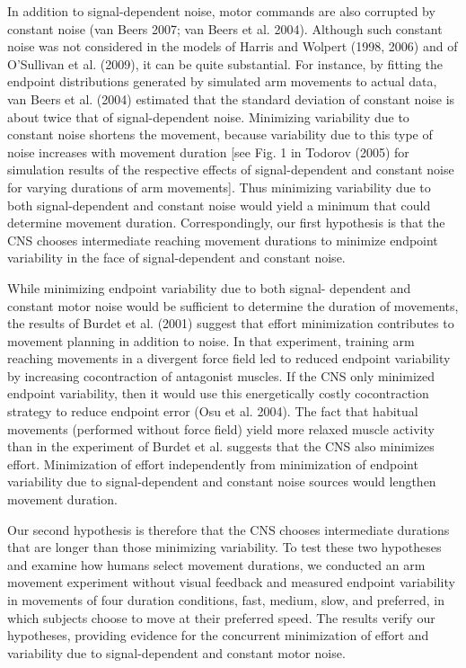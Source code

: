 In addition to signal-dependent noise, motor commands are also corrupted by constant noise (van Beers 2007; van Beers et al. 2004). Although such constant noise was not considered in the models of Harris and Wolpert (1998, 2006) and of O’Sullivan et al. (2009), it can be quite substantial. For instance, by fitting the endpoint distributions generated by simulated arm movements to actual data, van Beers et al. (2004) estimated that the standard deviation of constant noise is about twice that of signal-dependent noise. Minimizing variability due to constant noise shortens the movement, because variability due to this type of noise increases with movement duration [see Fig. 1 in Todorov (2005) for simulation results of the respective effects of signal-dependent and constant noise for varying durations of arm movements]. Thus minimizing variability due to both signal-dependent and constant noise would yield a minimum that could determine movement duration. Correspondingly, our first hypothesis is that the CNS chooses intermediate reaching movement durations to minimize endpoint variability in the face of signal-dependent and constant noise.

While minimizing endpoint variability due to both signal- dependent and constant motor noise would be sufficient to determine the duration of movements, the results of Burdet et al. (2001) suggest that effort minimization contributes to movement planning in addition to noise. In that experiment, training arm reaching movements in a divergent force field led to reduced endpoint variability by increasing cocontraction of antagonist muscles. If the CNS only minimized endpoint variability, then it would use this energetically costly cocontraction strategy to reduce endpoint error (Osu et al. 2004). The fact that habitual movements (performed without force field) yield more relaxed muscle activity than in the experiment of Burdet et al. suggests that the CNS also minimizes effort. Minimization of effort independently from minimization of endpoint variability due to signal-dependent and constant noise sources would lengthen movement duration.

Our second hypothesis is therefore that the CNS chooses intermediate durations that are longer than those minimizing variability. To test these two hypotheses and examine how humans select movement durations, we conducted an arm movement experiment without visual feedback and measured endpoint variability in movements of four duration conditions, fast, medium, slow, and preferred, in which subjects choose to move at their preferred speed. The results verify our hypotheses, providing evidence for the concurrent minimization of effort and variability due to signal-dependent and constant motor noise.

